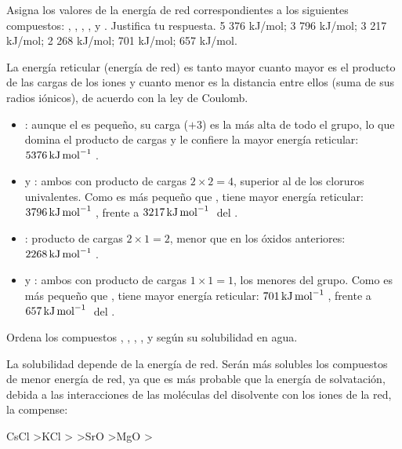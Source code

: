 \begin{exercise}
    Asigna los valores de la energía de red correspondientes
    a los siguientes compuestos: , , , ,
     y . Justifica tu respuesta.
    5 376 kJ/mol; 3 796 kJ/mol; 3 217 kJ/mol; 2 268 kJ/mol;
    701 kJ/mol; 657 kJ/mol.

    \begin{solu}


        La energía reticular (energía de red) es tanto mayor cuanto mayor es el producto de las cargas de los iones y cuanto menor es la distancia entre ellos (suma de sus radios iónicos), de acuerdo con la ley de Coulomb.

        \begin{itemize}
            \item {}: aunque el  es pequeño, su carga (\(+3\)) es la más alta de todo el grupo, lo que domina el producto de cargas y le confiere la mayor energía reticular: \(\energia[kjmol]{5376}\).
            \item {} y : ambos con producto de cargas \(2\times2=4\), superior al de los cloruros univalentes. Como  es más pequeño que ,  tiene mayor energía reticular: \(\energia[kjmol]{3796}\), frente a \(\energia[kjmol]{3217}\) del .
            \item {}: producto de cargas \(2\times1=2\), menor que en los óxidos anteriores: \(\energia[kjmol]{2268}\).
            \item {} y : ambos con producto de cargas \(1\times1=1\), los menores del grupo. Como  es más pequeño que ,  tiene mayor energía reticular: \(\energia[kjmol]{701}\), frente a \(\energia[kjmol]{657}\) del .
        \end{itemize}
    \end{solu}
\end{exercise}


\begin{exercise}
    Ordena los compuestos , , , ,  y  según su solubilidad en agua.
    \begin{solu}
        La solubilidad depende de la energía de red. Serán más solubles
        los compuestos de menor energía de red, ya que es más probable
        que la energía de solvatación, debida a las interacciones de
        las moléculas del disolvente con los iones de la red, la compense:

        CsCl \textgreater KCl \textgreater {} \textgreater SrO \textgreater MgO \textgreater {}
    \end{solu}
\end{exercise}


